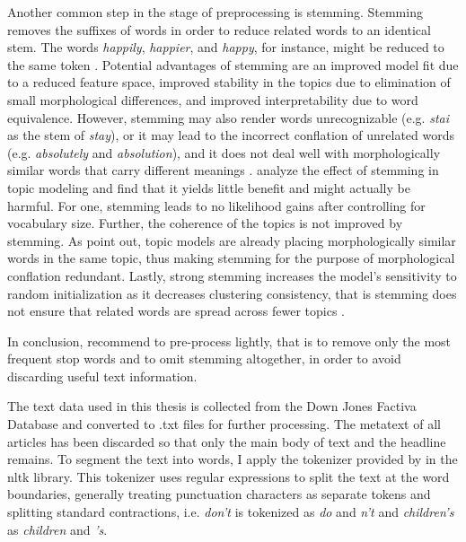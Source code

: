 \documentclass[11pt,a4paper,english,oneside]{book}
\numberwithin{equation}{chapter}
\begin{document}
Another common step in the stage of preprocessing is stemming. Stemming removes the suffixes of words in order to reduce related words to an identical stem. The words \textit{happily}, \textit{happier}, and \textit{happy}, for instance, might be reduced to the same token \cite[p. 287]{Schofield.2016}. Potential advantages of stemming are an improved model fit due to a reduced feature space, improved stability in the topics due to elimination of small morphological differences, and improved interpretability due to word equivalence.  However, stemming may also render words unrecognizable (e.g. \textit{stai} as the stem of \textit{stay}), or it may lead to the incorrect conflation of unrelated words (e.g. \textit{absolutely} and \textit{absolution}), and it does not deal well with morphologically similar words that carry different meanings \cite[p. 287]{Schofield.2016}. \cite{Schofield.2016} analyze the effect of stemming in topic modeling and find that it yields little benefit and might actually be harmful. For one, stemming leads to no likelihood gains after controlling for vocabulary size. Further, the coherence of the topics is not improved by stemming. As \citet{Schofield.2017} point out, topic models are already placing morphologically similar words in the same topic, thus making stemming for the purpose of morphological conflation redundant. Lastly, strong stemming increases the model's sensitivity to random initialization as it decreases clustering consistency, that is stemming does not ensure that related words are spread across fewer topics \cite[pp. 293--295]{Schofield.2016}.  

In conclusion, \cite{Schofield.2017} recommend to pre-process lightly, that is to remove only the most frequent stop words and to omit stemming altogether, in order to avoid discarding useful text information. 

The text data used in this thesis is collected from the Down Jones Factiva Database and converted to .txt files for further processing. The metatext of all articles has been discarded so that only the main body of text and the headline remains. To segment the text into words, I apply the tokenizer provided by \cite{Bird.2010} in the nltk library. This tokenizer uses regular expressions to split the text at the word boundaries, generally treating punctuation characters as separate tokens and splitting standard contractions, i.e. \textit{don't} is tokenized as \textit{do} and \textit{n't} and \textit{children's} as \textit{children} and \textit{'s}. 
\end{document}
